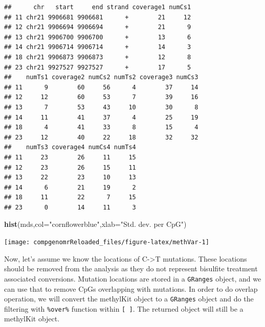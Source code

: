 \documentclass[12pt,]{krantz}
\newenvironment{Shaded}{\begin{snugshade}}{\end{snugshade}}
\newcommand{\DataTypeTok}[1]{\textcolor[rgb]{0.13,0.29,0.53}{#1}}
\newcommand{\KeywordTok}[1]{\textcolor[rgb]{0.13,0.29,0.53}{\textbf{#1}}}
\newcommand{\NormalTok}[1]{#1}
\newcommand{\StringTok}[1]{\textcolor[rgb]{0.31,0.60,0.02}{#1}}
\begin{document}
\begin{verbatim}
##      chr   start     end strand coverage1 numCs1
## 11 chr21 9906681 9906681      +        21     12
## 12 chr21 9906694 9906694      +        21      9
## 13 chr21 9906700 9906700      +        13      6
## 14 chr21 9906714 9906714      +        14      3
## 18 chr21 9906873 9906873      +        12      8
## 23 chr21 9927527 9927527      +        17      5
##    numTs1 coverage2 numCs2 numTs2 coverage3 numCs3
## 11      9        60     56      4        37     14
## 12     12        60     53      7        39     16
## 13      7        53     43     10        30      8
## 14     11        41     37      4        25     19
## 18      4        41     33      8        15      4
## 23     12        40     22     18        32     32
##    numTs3 coverage4 numCs4 numTs4
## 11     23        26     11     15
## 12     23        26     15     11
## 13     22        23     10     13
## 14      6        21     19      2
## 18     11        22      7     15
## 23      0        14     11      3
\end{verbatim}

\begin{Shaded}
\begin{Highlighting}[]
\KeywordTok{hist}\NormalTok{(mds,}\DataTypeTok{col=}\StringTok{"cornflowerblue"}\NormalTok{,}\DataTypeTok{xlab=}\StringTok{"Std. dev. per CpG"}\NormalTok{)}
\end{Highlighting}
\end{Shaded}

\begin{center}\texttt{[image: compgenomrReloaded\_files/figure-latex/methVar-1]} \end{center}

Now, let's assume we know the locations of C-\textgreater{}T mutations. These locations should be removed from the analysis as they do not represent
bisulfite treatment associated conversions. Mutation locations are
stored in a \texttt{GRanges} object, and we can use that to remove CpGs
overlapping with mutations. In order to do overlap operation, we will convert the methylKit object to a \texttt{GRanges} object and do the filtering with \texttt{\%over\%} function within \texttt{{[}\ {]}}. The returned object will still be a methylKit object.
\end{document}
